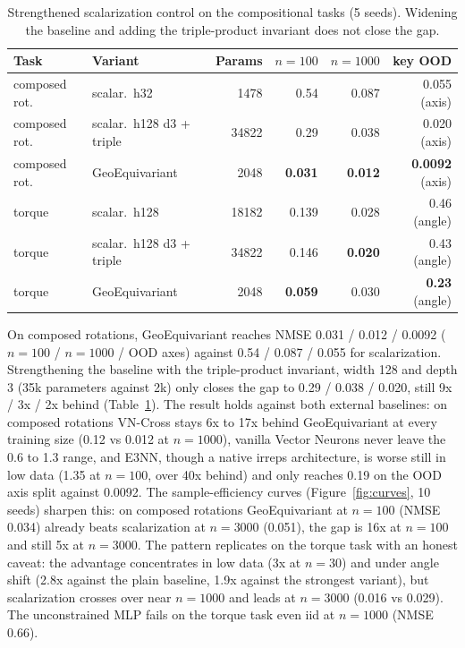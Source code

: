 \documentclass[11pt]{article}
\begin{document}
\begin{table}[t]
\centering
\caption{Strengthened scalarization control on the compositional tasks
(5 seeds). Widening the baseline and adding the triple-product invariant does
not close the gap.}
\label{tab:control}
\small
\begin{tabular}{llrrrr}
\toprule
Task & Variant & Params & $n{=}100$ & $n{=}1000$ & key OOD \\
\midrule
composed rot. & scalar.\ h32 & 1478 & 0.54 & 0.087 & 0.055 (axis) \\
composed rot. & scalar.\ h128 d3 + triple & 34822 & 0.29 & 0.038 & 0.020 (axis) \\
composed rot. & GeoEquivariant & 2048 & \textbf{0.031} & \textbf{0.012} & \textbf{0.0092} (axis) \\
\midrule
torque & scalar.\ h128 & 18182 & 0.139 & 0.028 & 0.46 (angle) \\
torque & scalar.\ h128 d3 + triple & 34822 & 0.146 & \textbf{0.020} & 0.43 (angle) \\
torque & GeoEquivariant & 2048 & \textbf{0.059} & 0.030 & \textbf{0.23} (angle) \\
\bottomrule
\end{tabular}
\end{table}

On composed rotations, GeoEquivariant reaches NMSE 0.031 / 0.012 / 0.0092
($n{=}100$ / $n{=}1000$ / OOD axes) against 0.54 / 0.087 / 0.055 for
scalarization. Strengthening the baseline with the triple-product invariant,
width 128 and depth 3 (35k parameters against 2k) only closes the gap to
0.29 / 0.038 / 0.020, still 9x / 3x / 2x behind (Table~\ref{tab:control}).
The result holds against both external baselines: on composed rotations
VN-Cross stays 6x to 17x behind GeoEquivariant at every training size
(0.12 vs 0.012 at $n{=}1000$), vanilla Vector Neurons never leave the
0.6 to 1.3 range, and E3NN, though a native irreps architecture, is worse
still in low data (1.35 at $n{=}100$, over 40x behind) and only reaches 0.19 on
the OOD axis split against 0.0092. The sample-efficiency curves (Figure~\ref{fig:curves},
10 seeds) sharpen this: on composed rotations GeoEquivariant at $n{=}100$
(NMSE 0.034) already beats scalarization at $n{=}3000$ (0.051), the gap is
16x at $n{=}100$ and still 5x at $n{=}3000$. The pattern replicates on the torque task with an
honest caveat: the advantage concentrates in low data (3x at $n{=}30$) and
under angle shift (2.8x against the plain baseline, 1.9x against the
strongest variant), but scalarization crosses over near $n{=}1000$ and leads
at $n{=}3000$ (0.016 vs 0.029). The unconstrained MLP fails on the torque
task even iid at $n{=}1000$ (NMSE 0.66).
\end{document}
